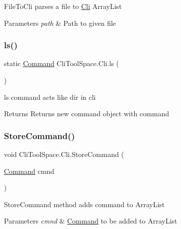 File\+To\+Cli parses a file to \mbox{\hyperlink{class_cli_tool_space_1_1_cli}{Cli}} Array\+List 


\begin{DoxyParams}{Parameters}
{\em path} & Path to given file\\
\hline
\end{DoxyParams}
\mbox{\label{class_cli_tool_space_1_1_cli_abea5ac9db69f60d7cec5103565873ae1}} 
\subsubsection{\texorpdfstring{ls()}{ls()}}
{\footnotesize\ttfamily static \mbox{\hyperlink{class_cli_tool_space_1_1_command}{Command}} Cli\+Tool\+Space.\+Cli.\+ls (\begin{DoxyParamCaption}{ }\end{DoxyParamCaption})\hspace{0.3cm}{\ttfamily [static]}}



ls command acts like dir in cli 

\begin{DoxyReturn}{Returns}
Returns new command object with command
\end{DoxyReturn}
\mbox{\label{class_cli_tool_space_1_1_cli_a967aa1e2dc3b03e32b8373cbccab922c}} 
\subsubsection{\texorpdfstring{StoreCommand()}{StoreCommand()}}
{\footnotesize\ttfamily void Cli\+Tool\+Space.\+Cli.\+Store\+Command (\begin{DoxyParamCaption}\item[{\mbox{\hyperlink{class_cli_tool_space_1_1_command}{Command}}}]{cmnd }\end{DoxyParamCaption})}



Store\+Command method adds command to Array\+List 


\begin{DoxyParams}{Parameters}
{\em cmnd} & \mbox{\hyperlink{class_cli_tool_space_1_1_command}{Command}} to be added to Array\+List\\
\hline
\end{DoxyParams}
\mbox{\label{class_cli_tool_space_1_1_cli_a20d3ab2d3b6ddc56c74bf3a5dc98fd4d}} 
